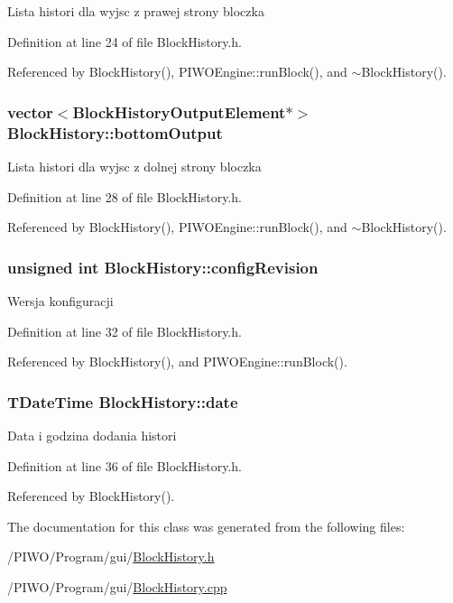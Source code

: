 Lista histori dla wyjsc z prawej strony bloczka 

Definition at line 24 of file BlockHistory.h.

Referenced by BlockHistory(), PIWOEngine::runBlock(), and $\sim$BlockHistory().\hypertarget{classBlockHistory_d6bac65bd73326840162bbb9cd8d14c1}{
\subsubsection[bottomOutput]{\setlength{\rightskip}{0pt plus 5cm}vector$<${\bf BlockHistoryOutputElement}$\ast$$>$ {\bf BlockHistory::bottomOutput}}}
\label{classBlockHistory_d6bac65bd73326840162bbb9cd8d14c1}


Lista histori dla wyjsc z dolnej strony bloczka 

Definition at line 28 of file BlockHistory.h.

Referenced by BlockHistory(), PIWOEngine::runBlock(), and $\sim$BlockHistory().\hypertarget{classBlockHistory_a491be49ba9d081df6d1213481346ea9}{
\subsubsection[configRevision]{\setlength{\rightskip}{0pt plus 5cm}unsigned int {\bf BlockHistory::configRevision}}}
\label{classBlockHistory_a491be49ba9d081df6d1213481346ea9}


Wersja konfiguracji 

Definition at line 32 of file BlockHistory.h.

Referenced by BlockHistory(), and PIWOEngine::runBlock().\hypertarget{classBlockHistory_0b1d6f43a3ba643ad8f387f7c9f2abc7}{
\subsubsection[date]{\setlength{\rightskip}{0pt plus 5cm}TDateTime {\bf BlockHistory::date}}}
\label{classBlockHistory_0b1d6f43a3ba643ad8f387f7c9f2abc7}


Data i godzina dodania histori 

Definition at line 36 of file BlockHistory.h.

Referenced by BlockHistory().

The documentation for this class was generated from the following files:\begin{CompactItemize}
\item 
/PIWO/Program/gui/\hyperlink{BlockHistory_8h}{BlockHistory.h}\item 
/PIWO/Program/gui/\hyperlink{BlockHistory_8cpp}{BlockHistory.cpp}\end{CompactItemize}
